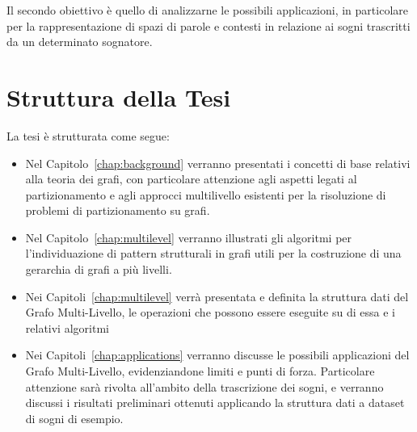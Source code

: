 Il secondo obiettivo \`e quello di analizzarne le possibili applicazioni, in particolare per la
rappresentazione di spazi di parole e contesti in relazione ai sogni trascritti da un determinato sognatore. \newline

\section*{Struttura della Tesi}

La tesi \`e strutturata come segue:
\begin{itemize}
    \item Nel Capitolo~\ref{chap:background} verranno presentati i concetti di base relativi alla teoria dei grafi,
    con particolare attenzione agli aspetti legati al partizionamento e agli approcci multilivello esistenti per la
    risoluzione di problemi di partizionamento su grafi.
    \item Nel Capitolo~\ref{chap:multilevel} verranno illustrati gli algoritmi per l'individuazione di pattern
    strutturali in grafi utili per la costruzione di una gerarchia di grafi a pi\`u livelli.
    \item Nei Capitoli~\ref{chap:multilevel} verr\`a presentata e definita la struttura dati del Grafo Multi-Livello,
    le operazioni che possono essere eseguite su di essa e i relativi algoritmi
    \item Nei Capitoli~\ref{chap:applications} verranno discusse le possibili applicazioni del Grafo Multi-Livello,
    evidenziandone limiti e punti di forza.
    Particolare attenzione sar\`a rivolta all'ambito della trascrizione dei sogni, e verranno discussi i risultati
    preliminari ottenuti applicando la struttura dati a dataset di sogni di esempio.
\end{itemize}